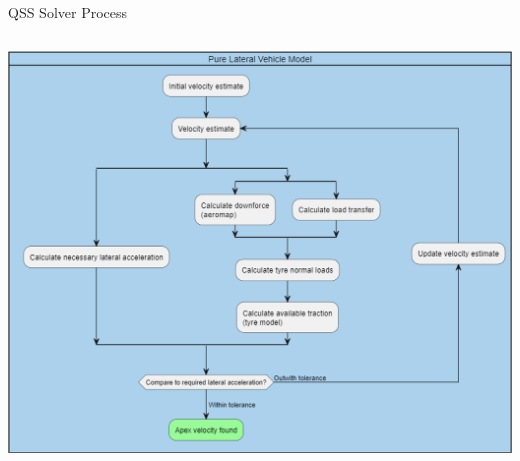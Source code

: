 \begin{frame}{QSS Solver Process}
\begin{columns}
        \includegraphics[width=\textwidth]{res/Lateral Vehicle Model.png} \\
    \end{columns}
\end{frame}